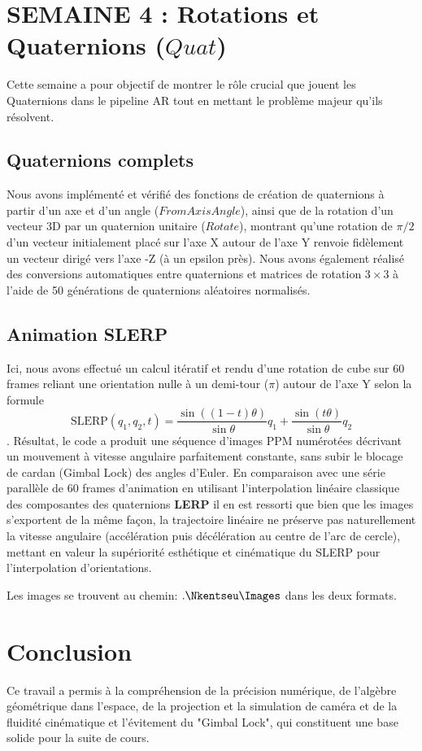 \documentclass[12pt,a4paper]{report}
\begin{document}
\chapter{SEMAINE 4 : Rotations et Quaternions ($Quat$)}

Cette semaine a pour objectif de montrer le rôle crucial que jouent les Quaternions dans le pipeline AR tout en mettant le problème majeur qu'ils résolvent.

\section{Quaternions complets}

Nous avons implémenté et vérifié des fonctions de création de quaternions à partir d'un axe et d'un angle ($FromAxisAngle$), ainsi que de la rotation d'un vecteur 3D par un quaternion unitaire ($Rotate$), montrant qu'une rotation de $\pi/2$ d'un vecteur initialement placé sur l'axe X autour de l'axe Y renvoie fidèlement un vecteur dirigé vers l'axe -Z (à un epsilon près). Nous avons également réalisé des conversions automatiques entre quaternions et matrices de rotation $3\times 3$ à l'aide de 50 générations de quaternions aléatoires normalisés.

\section{Animation SLERP}

Ici, nous avons effectué un calcul itératif et rendu d'une rotation de cube sur 60 frames reliant une orientation nulle à un demi-tour ($\pi$) autour de l'axe Y selon la formule $$\text{SLERP}(q_1, q_2, t) = \frac{\sin((1-t)\theta)}{\sin \theta}q_1 + \frac{\sin(t\theta)}{\sin \theta}q_2$$. Résultat, le code a produit une séquence d'images PPM numérotées décrivant un mouvement à vitesse angulaire parfaitement constante, sans subir le blocage de cardan (Gimbal Lock) des angles d'Euler.
En comparaison avec une série parallèle de 60 frames d'animation en utilisant l'interpolation linéaire classique des composantes des quaternions \textbf{LERP} il en est ressorti que bien que les images s'exportent de la même façon, la trajectoire linéaire ne préserve pas naturellement la vitesse angulaire (accélération puis décélération au centre de l'arc de cercle), mettant en valeur la supériorité esthétique et cinématique du SLERP pour l'interpolation d'orientations.

Les images se trouvent au chemin: $.\Nkentseu\Images$ dans les deux formats.

\chapter*{Conclusion}

Ce travail a permis à la compréhension de la précision numérique, de l'algèbre géométrique dans l'espace, de la projection et la simulation de caméra et de la fluidité cinématique et l'évitement du "Gimbal Lock", qui constituent une base solide pour la suite de cours.
\end{document}
